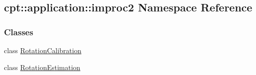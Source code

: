 \hypertarget{namespacecpt_1_1application_1_1improc2}{\subsection{cpt\-:\-:application\-:\-:improc2 Namespace Reference}
\label{namespacecpt_1_1application_1_1improc2}
}
\subsubsection*{Classes}
\begin{DoxyCompactItemize}
\item 
class \hyperlink{classcpt_1_1application_1_1improc2_1_1_rotation_calibration}{Rotation\-Calibration}
\item 
class \hyperlink{classcpt_1_1application_1_1improc2_1_1_rotation_estimation}{Rotation\-Estimation}
\end{DoxyCompactItemize}
